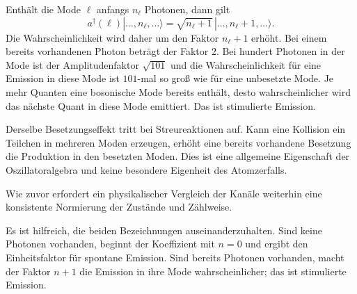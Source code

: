 Enthält die Mode \(\ell\) anfangs \(n_\ell\) Photonen, dann gilt
\begin{equation}
a^\dagger(\ell)
|\ldots,n_\ell,\ldots\rangle
=
\sqrt{n_\ell+1}
\,|\ldots,n_\ell+1,\ldots\rangle.
\end{equation}
Die Wahrscheinlichkeit wird daher um den Faktor \(n_\ell+1\) erhöht. Bei einem bereits vorhandenen Photon beträgt der Faktor \(2\). Bei hundert Photonen in der Mode ist der Amplitudenfaktor \(\sqrt{101}\) und die Wahrscheinlichkeit für eine Emission in diese Mode ist \(101\)-mal so groß wie für eine unbesetzte Mode. Je mehr Quanten eine bosonische Mode bereits enthält, desto wahrscheinlicher wird das nächste Quant in diese Mode emittiert. Das ist stimulierte Emission.

Derselbe Besetzungseffekt tritt bei Streureaktionen auf. Kann eine Kollision ein Teilchen in mehreren Moden erzeugen, erhöht eine bereits vorhandene Besetzung die Produktion in den besetzten Moden. Dies ist eine allgemeine Eigenschaft der Oszillatoralgebra und keine besondere Eigenheit des Atomzerfalls.

\begin{classroomqa}
\end{classroomqa}

Wie zuvor erfordert ein physikalischer Vergleich der Kanäle weiterhin eine konsistente Normierung der Zustände und Zählweise.

\begin{classroomqa}
\end{classroomqa}

Es ist hilfreich, die beiden Bezeichnungen auseinanderzuhalten. Sind keine Photonen vorhanden, beginnt der Koeffizient mit \(n=0\) und ergibt den Einheitsfaktor für spontane Emission. Sind bereits Photonen vorhanden, macht der Faktor \(n+1\) die Emission in ihre Mode wahrscheinlicher; das ist stimulierte Emission.

